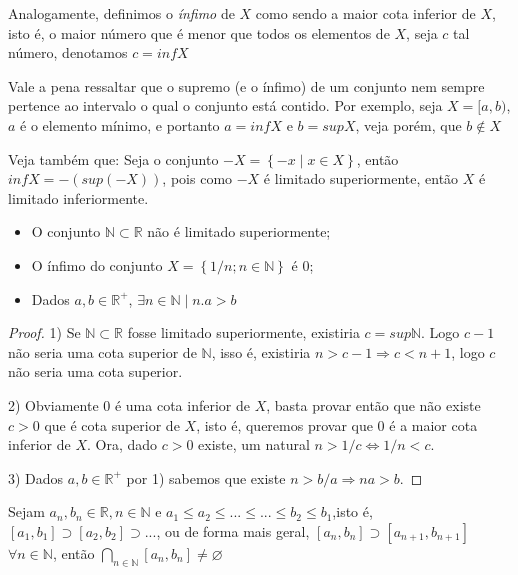 Analogamente, definimos o \textit{ínfimo} de $X$ como sendo a maior cota inferior de $X$, isto é, o maior número que é menor que todos os elementos de $X$, seja $c$ tal número, denotamos $c=infX$

Vale a pena ressaltar que o supremo (e o ínfimo) de um conjunto nem sempre pertence ao intervalo o qual o conjunto está contido. Por exemplo, seja $X=[a,b)$, $a$ é o elemento mínimo, e portanto $a=infX$ e $b=supX$, veja porém, que $b \notin X $

Veja também que: Seja o conjunto $-X=\left \{ -x \mid x \in X \right \}$, então $infX=-(sup(-X))$, pois como $-X$ é limitado superiormente, então $X$ é limitado inferiormente.
\begin{theorem} 
\begin{itemize}
    \item O conjunto $\mathbb{N} \subset \mathbb{R}$ não é limitado superiormente;
    \item O ínfimo do conjunto $X=\left \{ 1/n; n \in \mathbb{N} \right \}$ é 0;
    \item Dados $a,b \in \mathbb{R}^{+}$, $\exists n \in\mathbb{N} \mid n.a>b$
\end{itemize}
\end{theorem}
\begin{proof}
1) Se $\mathbb{N} \subset \mathbb{R}$ fosse limitado superiormente, existiria $c=sup\mathbb{N}$. Logo $c-1$ não seria uma cota superior de $\mathbb{N}$, isso é, existiria $n > c-1 \Rightarrow c<n+1$, logo $c$ não seria uma cota superior.\qedsymbol

2) Obviamente $0$ é uma cota inferior de $X$, basta provar então que não existe $c>0$ que é cota superior de $X$, isto é, queremos provar que $0$ é a maior cota inferior de $X$. Ora, dado $c>0$ existe, um natural $n>1/c \Leftrightarrow 1/n<c$. \qedsymbol

3) Dados $a,b \in \mathbb{R}^{+}$ por 1) sabemos que existe $n>b/a \Rightarrow na>b$.
\end{proof}

\begin{theorem}
Sejam $a_{n},b_{n} \in \mathbb{R}, n \in \mathbb{N}$ e $a_{1} \leq a_{2} \leq ...\leq... \leq b_{2} \leq b_{1}$,isto é, $[a_{1},b_{1}] \supset [a_{2},b_{2}] \supset ...$, ou de forma mais geral, $[a_{n},b_{n}] \supset [a_{n+1},b_{n+1}]$ $\forall n \in \mathbb{N}$, então $\bigcap_{n \in \mathbb{N}}[a_{n},b_{n}] \neq \varnothing $ 
\end{theorem}

